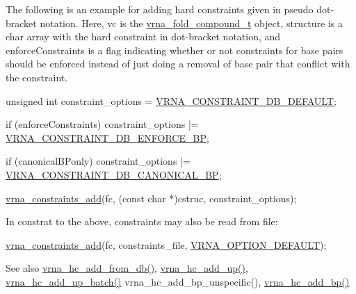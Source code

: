 The following is an example for adding hard constraints given in pseudo dot-\/bracket notation. Here, {\ttfamily vc} is the \mbox{\hyperlink{group__fold__compound_ga1b0cef17fd40466cef5968eaeeff6166}{vrna\+\_\+fold\+\_\+compound\+\_\+t}} object, {\ttfamily structure} is a char array with the hard constraint in dot-\/bracket notation, and {\ttfamily enforce\+Constraints} is a flag indicating whether or not constraints for base pairs should be enforced instead of just doing a removal of base pair that conflict with the constraint.


\begin{DoxyCodeInclude}
      \textcolor{keywordtype}{unsigned} \textcolor{keywordtype}{int} constraint\_options = \mbox{\hyperlink{group__hard__constraints_ga1c3864bdc92147a4d93de2b1b4356177}{VRNA\_CONSTRAINT\_DB\_DEFAULT}};

      \textcolor{keywordflow}{if} (enforceConstraints)
        constraint\_options |= \mbox{\hyperlink{group__hard__constraints_ga29ebe940110d60ab798fdacbcdbbfb7d}{VRNA\_CONSTRAINT\_DB\_ENFORCE\_BP}};

      \textcolor{keywordflow}{if} (canonicalBPonly)
        constraint\_options |= \mbox{\hyperlink{constraints__hard_8h_a10fadeec2d291a851fe2197051cf842c}{VRNA\_CONSTRAINT\_DB\_CANONICAL\_BP}};

      \mbox{\hyperlink{group__constraints_ga35a401f680969a556858a8dd5f1d07cc}{vrna\_constraints\_add}}(fc, (\textcolor{keyword}{const} \textcolor{keywordtype}{char} *)cstruc, constraint\_options);
\end{DoxyCodeInclude}
 In constrat to the above, constraints may also be read from file\+:


\begin{DoxyCodeInclude}
    \mbox{\hyperlink{group__constraints_ga35a401f680969a556858a8dd5f1d07cc}{vrna\_constraints\_add}}(fc, constraints\_file, 
      \mbox{\hyperlink{group__fold__compound_gacea5b7ee6181c485f36e2afa0e9089e4}{VRNA\_OPTION\_DEFAULT}});
\end{DoxyCodeInclude}
 \begin{DoxySeeAlso}{See also}
\mbox{\hyperlink{group__hard__constraints_ga5b4de3247b67358080c176b94591a8e6}{vrna\+\_\+hc\+\_\+add\+\_\+from\+\_\+db()}}, \mbox{\hyperlink{group__hard__constraints_ga447d88e06ad97bb225cd83310ace8345}{vrna\+\_\+hc\+\_\+add\+\_\+up()}}, \mbox{\hyperlink{group__hard__constraints_ga5070f296c8af2baea10951525519464f}{vrna\+\_\+hc\+\_\+add\+\_\+up\+\_\+batch()}} vrna\+\_\+hc\+\_\+add\+\_\+bp\+\_\+unspecific(), \mbox{\hyperlink{group__hard__constraints_ga7cba95ebe2ceb5ec9a5768f2232854fd}{vrna\+\_\+hc\+\_\+add\+\_\+bp()}}
\end{DoxySeeAlso}


